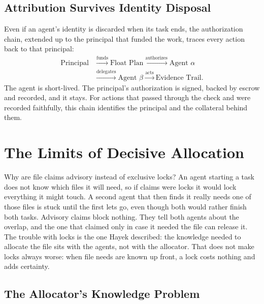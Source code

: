 \documentclass[11pt,a4paper]{article}
\theoremstyle{definition}
\theoremstyle{remark}
\begin{document}
\subsection{Attribution Survives Identity Disposal}\label{sec:attribution-survives}

Even if an agent's identity is discarded when its task ends, the authorization chain, extended up to the principal that funded the work, traces every action back to that principal:
\[
\begin{aligned}
\text{Principal} &\xrightarrow{\text{funds}} \text{Float Plan} \xrightarrow{\text{authorizes}} \text{Agent } \alpha\\
&\xrightarrow{\text{delegates}} \text{Agent } \beta \xrightarrow{\text{acts}} \text{Evidence Trail}.
\end{aligned}
\]
The agent is short-lived. The principal's authorization is signed, backed by escrow and recorded, and it stays. For actions that passed through the check and were recorded faithfully, this chain identifies
the principal and the collateral behind them.

\section{The Limits of Decisive Allocation}\label{sec:sen}

Why are file claims advisory instead of exclusive locks? An agent starting a task does not know which files it will need, so if claims were locks it would lock everything it might touch. A second agent that then finds it really needs one of those files is stuck until the first lets go, even though both would rather finish both tasks. Advisory claims block nothing. They tell both agents about the overlap, and the one that claimed only in case it needed the file can release it. The trouble with locks is the one Hayek described: the knowledge needed to allocate the file sits with the agents, not with the allocator. That does not make locks always worse: when file needs are known up front, a lock costs nothing and adds certainty.

\subsection{The Allocator's Knowledge Problem}
\end{document}
